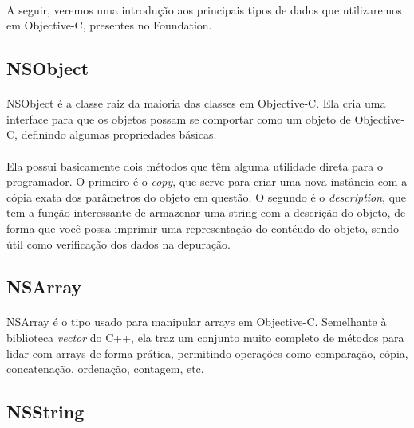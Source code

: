 \documentclass[a4paper,12pt,brazil,doubleside]{book}
\begin{document}
\paragraph{}A seguir, veremos uma introdução aos principais tipos de dados que utilizaremos em Objective-C, presentes no Foundation.

\bigskip

\subsection{NSObject}

\paragraph{}NSObject é a classe raiz da maioria das classes em Objective-C. Ela cria uma interface para que os objetos possam se comportar como um objeto de Objective-C, definindo algumas propriedades básicas.
\paragraph{}Ela possui basicamente dois métodos que têm alguma utilidade direta para o programador. O primeiro é o \emph{copy}, que serve para criar uma nova instância com a cópia exata dos parâmetros do objeto em questão. O segundo é o \emph{description}, que tem a função interessante de armazenar uma string com a descrição do objeto, de forma que você possa imprimir uma representação do contéudo do objeto, sendo útil como verificação dos dados na depuração.

\bigskip

\subsection{NSArray}

\paragraph{}NSArray é o tipo usado para manipular arrays em Objective-C. Semelhante à biblioteca \emph{vector} do C++, ela traz um conjunto muito completo de métodos para lidar com arrays de forma prática, permitindo operações como comparação, cópia, concatenação, ordenação, contagem, etc.

\bigskip

\subsection{NSString}
\end{document}
